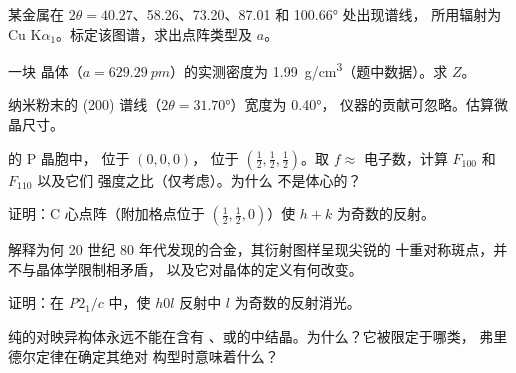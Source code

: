 \begin{exercise}[$\star\star$]\label{exo:b3:x-ray-diffraction:5}
某金属在 $2\theta = 40.27$、58.26、73.20、87.01 和 \ang{100.66} 处出现谱线，
所用辐射为 Cu K$\alpha_1$。标定该图谱，求出点阵类型及 $a$。
\end{exercise}

\begin{exercise}[$\star\star$]\label{exo:b3:x-ray-diffraction:6}
一块  晶体（$a = \qty{629.29}{pm}$）的实测密度为
\qty{1.99}{g/cm^3}（题中数据）。求 $Z$。
\end{exercise}

\begin{exercise}[$\star\star$]\label{exo:b3:x-ray-diffraction:7}
 纳米粉末的 (200) 谱线（$2\theta = \ang{31.70}$）宽度为 \ang{0.40}，
仪器的贡献可忽略。估算微晶尺寸。
\end{exercise}

\begin{exercise}[$\star\star$]\label{exo:b3:x-ray-diffraction:8}
 的 P 晶胞中， 位于 $(0,0,0)$， 位于 $(\frac12,\frac12,\frac12)$。取 $f
\approx$ 电子数，计算 $F_{100}$ 和 $F_{110}$ 以及它们
强度之比（仅考虑）。为什么  不是体心的？
\end{exercise}

\begin{exercise}[$\star\star$]\label{exo:b3:x-ray-diffraction:9}
证明：C 心点阵（附加格点位于 $(\frac12,\frac12,0)$）使
$h + k$ 为奇数的反射。
\end{exercise}

\begin{exercise}[$\star\star\star$]\label{exo:b3:x-ray-diffraction:10}
解释为何 20 世纪 80 年代发现的合金，其衍射图样呈现尖锐的
十重对称斑点，并不与晶体学限制相矛盾，
以及它对晶体的定义有何改变。
\end{exercise}

\begin{exercise}[$\star\star\star$]\label{exo:b3:x-ray-diffraction:11}
证明：在 \textit{P}$2_1/c$ 中，使 $h0l$ 反射中
$l$ 为奇数的反射消光。
\end{exercise}

\begin{exercise}[$\star\star\star$]\label{exo:b3:x-ray-diffraction:12}
纯的对映异构体永远不能在含有
、或的中结晶。为什么？它被限定于哪类，
弗里德尔定律在确定其绝对
构型时意味着什么？
\end{exercise}


